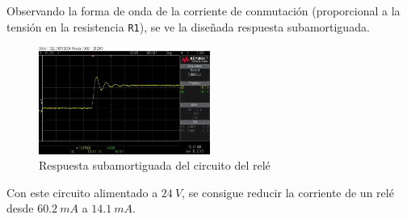 Observando la forma de onda de la corriente de conmutación (proporcional a la tensión en la resistencia \texttt{R1}), se ve la diseñada respuesta subamortiguada.

\begin{figure}[H]
    \centering
    \includegraphics[width=0.5\textwidth]{images/2-hardware/componentes/rele/respuestaSubamortiguada.jpg}
    \caption{Respuesta subamortiguada del circuito del relé}
    \label{fig:hardware/reles/respuesta}
\end{figure}

Con este circuito alimentado a $24\ V$, se consigue reducir la corriente de un relé desde $60.2\ mA$ a $14.1\ mA$.